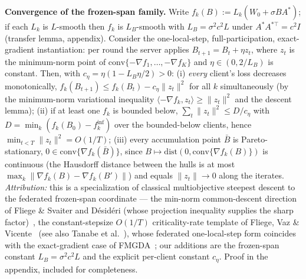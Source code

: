 \documentclass[sigconf,anonymous,review]{acmart}
\begin{document}
\textbf{Convergence of the frozen-span family.} Write $f_k(B) := L_k(W_0 + \sigma B A^\ast)$; if each $L_k$ is $L$-smooth then $f_k$ is $L_B$-smooth with $L_B = \sigma^2 c^2 L$ under $A^\ast A^{\ast\top} = c^2 I$ (transfer lemma, appendix). Consider the one-local-step, full-participation, exact-gradient instantiation: per round the server applies $B_{t+1} = B_t + \eta z_t$, where $z_t$ is the minimum-norm point of $\mathrm{conv}\{-\nabla f_1, \dots, -\nabla f_K\}$ and $\eta \in (0, 2/L_B)$ is constant. Then, with $c_\eta = \eta(1 - L_B\eta/2) > 0$: (i) \emph{every} client's loss decreases monotonically, $f_k(B_{t+1}) \le f_k(B_t) - c_\eta\lVert z_t\rVert^2$ for all $k$ simultaneously (by the minimum-norm variational inequality $\langle -\nabla f_k, z_t\rangle \ge \lVert z_t\rVert^2$ and the descent lemma); (ii) if at least one $f_k$ is bounded below, $\sum_t \lVert z_t\rVert^2 \le D/c_\eta$ with $D = \min_k (f_k(B_0) - f_k^{\inf})$ over the bounded-below clients, hence $\min_{t<T}\lVert z_t\rVert^2 = O(1/T)$; (iii) every accumulation point $\bar B$ is Pareto-stationary, $0 \in \mathrm{conv}\{\nabla f_k(\bar B)\}$, since $B \mapsto \mathrm{dist}(0, \mathrm{conv}\{\nabla f_k(B)\})$ is continuous (the Hausdorff distance between the hulls is at most $\max_k \lVert\nabla f_k(B) - \nabla f_k(B')\rVert$) and equals $\lVert z_t\rVert \to 0$ along the iterates. \emph{Attribution:} this is a specialization of classical multiobjective steepest descent to the federated frozen-span coordinate --- the min-norm common-descent direction of Fliege \& Svaiter and D\'esid\'eri (whose projection inequality supplies the sharp factor)~\cite{fliege2000steepest,desideri2012mgda}, the constant-stepsize $O(1/T)$ criticality-rate template of Fliege, Vaz \& Vicente~\cite{fliege2019complexity} (see also Tanabe et al.~\cite{tanabe2023proximal}), whose federated one-local-step form coincides with the exact-gradient case of FMGDA~\cite{yang2023fmgda}; our additions are the frozen-span constant $L_B = \sigma^2c^2L$ and the explicit per-client constant $c_\eta$. Proof in the appendix, included for completeness.
\end{document}
